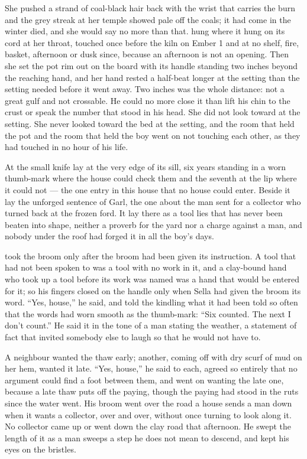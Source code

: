 She pushed a strand of coal-black hair back with the wrist that carries the burn and the grey streak at her temple showed pale off the coals; it had come in the winter  died, and she would say no more than that.  hung where it hung on its cord at her throat, touched once before the kiln on Ember 1 and at no shelf, fire, basket, afternoon or dusk since, because an afternoon is not an opening. Then she set the pot rim out on the board with its handle standing two inches beyond the reaching hand, and her hand rested a half-beat longer at the setting than the setting needed before it went away. Two inches was the whole distance: not a great gulf and not crossable. He could no more close it than lift his chin to the crust or speak the number that stood in his head. She did not look toward  at the setting. She never looked toward the bed at the setting, and the room that held the pot and the room that held the boy went on not touching each other, as they had touched in no hour of his life.

\scenebreak

At  the small knife lay at the very edge of its sill, six years standing in a worn thumb-mark where the house could check them and the seventh at the lip where it could not --- the one entry in this house that no house could enter. Beside it lay the unforged sentence of Garl, the one about the man sent for a collector who turned back at the frozen ford. It lay there as a tool lies that has never been beaten into shape, neither a proverb for the yard nor a charge against a man, and nobody under the roof had forged it in all the boy's days.

 took the broom only after the broom had been given its instruction. A tool that had not been spoken to was a tool with no work in it, and a clay-bound hand who took up a tool before its work was named was a hand that would be entered for it; so his fingers closed on the handle only when Sella had given the broom its word. “Yes, house,” he said, and told the kindling what it had been told so often that the words had worn smooth as the thumb-mark: “Six counted. The next I don't count.” He said it in the tone of a man stating the weather, a statement of fact that invited somebody else to laugh so that he would not have to.

A neighbour wanted the thaw early; another, coming off  with dry scurf of mud on her hem, wanted it late. “Yes, house,” he said to each, agreed so entirely that no argument could find a foot between them, and went on wanting the late one, because a late thaw puts off the paying, though the paying had stood in the ruts since the water went. His broom went over the road a house sends a man down when it wants a collector, over and over, without once turning to look along it. No collector came up or went down the clay road that afternoon. He swept the length of it as a man sweeps a step he does not mean to descend, and kept his eyes on the bristles.

